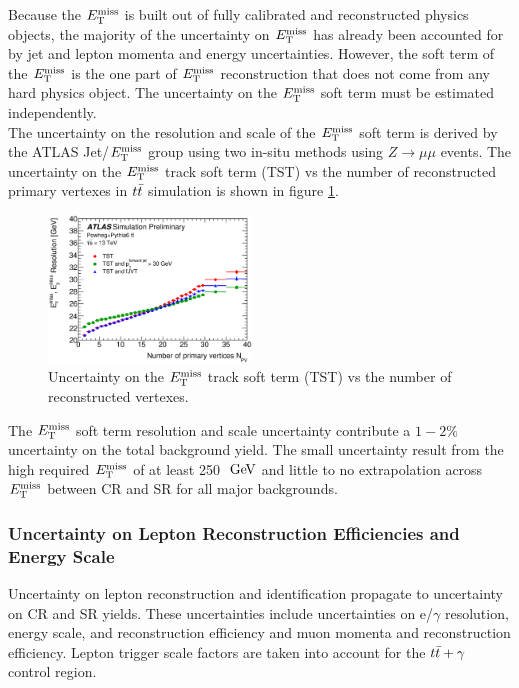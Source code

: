 \indent Because the $E_{\mathrm{T}}^{\mathrm{miss}}$ is built out of fully calibrated and reconstructed physics objects, the majority of the uncertainty on $E_{\mathrm{T}}^{\mathrm{miss}}$ has already been accounted for by jet and lepton momenta and energy uncertainties.  However, the soft term of the $E_{\mathrm{T}}^{\mathrm{miss}}$ is the one part of $E_{\mathrm{T}}^{\mathrm{miss}}$ reconstruction that does not come from any hard physics object.  The uncertainty on the $E_{\mathrm{T}}^{\mathrm{miss}}$ soft term must be estimated independently.  \\

\indent The uncertainty on the resolution and scale of the $E_{\mathrm{T}}^{\mathrm{miss}}$ soft term is derived by the ATLAS Jet/$E_{\mathrm{T}}^{\mathrm{miss}}$ group using two in-situ methods using $Z\rightarrow \mu\mu$ events. The uncertainty on the $E_{\mathrm{T}}^{\mathrm{miss}}$ track soft term (TST) vs the number of reconstructed primary vertexes in $t\bar{t}$ simulation is shown in figure \ref{fig:sys:MET_TST_tt}. \\

\begin{figure}[!htbp]
\begin{center}
\includegraphics[width=0.48\textwidth]{figures/METCalib/MET_TST_tt.eps}
\caption{Uncertainty on the $E_{\mathrm{T}}^{\mathrm{miss}}$ track soft term (TST) vs the number of reconstructed vertexes.  }
\label{fig:sys:MET_TST_tt}
\end{center}
\end{figure}

\indent The $E_{\mathrm{T}}^{\mathrm{miss}}$ soft term resolution and scale uncertainty contribute a $1-2\%$ uncertainty on the total background yield.  The small uncertainty result from the high required $E_{\mathrm{T}}^{\mathrm{miss}}$ of at least 250 $\gev$ and little to no extrapolation across $E_{\mathrm{T}}^{\mathrm{miss}}$ between CR and SR for all major backgrounds. \\

\subsubsection*{Uncertainty on Lepton Reconstruction Efficiencies and Energy Scale}

\indent Uncertainty on lepton reconstruction and identification propagate to uncertainty on CR and SR yields.  These uncertainties include uncertainties on e/$\gamma$ resolution, energy scale, and reconstruction efficiency and muon momenta and reconstruction efficiency.  Lepton trigger scale factors are taken into account for the $t\bar{t}+\gamma$ control region. \\

